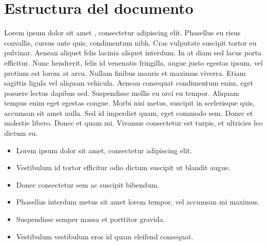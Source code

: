\section{Estructura del documento}\label{sec:estructura}
Lorem ipsum dolor sit amet \cite{entry2013one}, consectetur adipiscing elit. Phasellus eu risus convallis, cursus ante quis, condimentum nibh. Cras vulputate suscipit tortor eu pulvinar. Aenean aliquet felis lacinia aliquet interdum. In at diam sed lacus porta efficitur. Nunc hendrerit, felis id venenatis fringilla, augue justo egestas ipsum, vel pretium est lorem at arcu. Nullam finibus mauris et maximus viverra. Etiam sagittis ligula vel aliquam vehicula. Aenean consequat condimentum enim, eget posuere lectus dapibus sed. Suspendisse mollis  eu orci eu tempor. Aliquam tempus enim eget egestas congue. Morbi nisi metus, suscipit in scelerisque quis, accumsan sit amet nulla. Sed id imperdiet quam, eget commodo sem. Donec et molestie libero. Donec et quam mi. Vivamus consectetur est turpis, et ultricies leo dictum eu.\par

\begin{itemize}
    \item Lorem ipsum dolor sit amet, consectetur adipiscing elit.
    \item Vestibulum id tortor efficitur odio dictum suscipit ut blandit augue.
    \item Donec consectetur sem ac suscipit bibendum.
    \item Phasellus interdum metus sit amet lorem tempor, vel accumsan mi maximus.
    \item Suspendisse semper massa et porttitor gravida.
    \item Vestibulum vestibulum eros id quam eleifend consequat.
\end{itemize}{}

    
